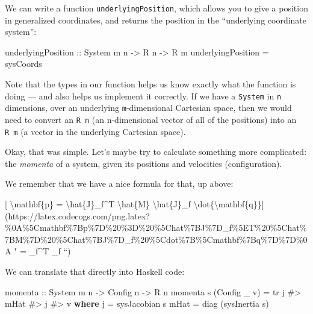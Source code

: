 \documentclass[]{article}
\newenvironment{Shaded}{}{}
\newcommand{\KeywordTok}[1]{\textcolor[rgb]{0.00,0.44,0.13}{\textbf{#1}}}
\newcommand{\DataTypeTok}[1]{\textcolor[rgb]{0.56,0.13,0.00}{#1}}
\newcommand{\OtherTok}[1]{\textcolor[rgb]{0.00,0.44,0.13}{#1}}
\newcommand{\FunctionTok}[1]{\textcolor[rgb]{0.02,0.16,0.49}{#1}}
\newcommand{\NormalTok}[1]{#1}
\begin{document}
We can write a function \texttt{underlyingPosition}, which allows you to give a
position in generalized coordinates, and returns the position in the
``underlying coordinate system'':

\begin{Shaded}
\begin{Highlighting}[]
\OtherTok{underlyingPosition ::} \DataTypeTok{System}\NormalTok{ m n }\OtherTok{->} \DataTypeTok{R}\NormalTok{ n }\OtherTok{->} \DataTypeTok{R}\NormalTok{ m}
\NormalTok{underlyingPosition }\FunctionTok{=}\NormalTok{ sysCoords}
\end{Highlighting}
\end{Shaded}

Note that the types in our function helps us know exactly what the function is
doing --- and also helps us implement it correctly. If we have a \texttt{System}
in \texttt{n} dimensions, over an underlying \texttt{m}-dimensional Cartesian
space, then we would need to convert an \texttt{R\ n} (an n-dimensional vector
of all of the positions) into an \texttt{R\ m} (a vector in the underlying
Cartesian space).

Okay, that was simple. Let's maybe try to calculate something more complicated:
the \emph{momenta} of a system, given its positions and velocities
(configuration).

We remember that we have a nice formula for that, up above:

{[} \textbackslash{}mathbf\{p\} = \textbackslash{}hat\{J\}\_f\^{}T
\textbackslash{}hat\{M\} \textbackslash{}hat\{J\}\_f
\textbackslash{}dot\{\textbackslash{}mathbf\{q\}\}{]}(https://latex.codecogs.com/png.latex?\%0A\%5Cmathbf\%7Bp\%7D\%20\%3D\%20\%5Chat\%7BJ\%7D\_f\%5ET\%20\%5Chat\%7BM\%7D\%20\%5Chat\%7BJ\%7D\_f\%20\%5Cdot\%7B\%5Cmathbf\%7Bq\%7D\%7D\%0A
"  = \_f\^{}T  \_f  ``)

We can translate that directly into Haskell code:

\begin{Shaded}
\begin{Highlighting}[]
\OtherTok{momenta ::} \DataTypeTok{System}\NormalTok{ m n }\OtherTok{->} \DataTypeTok{Config}\NormalTok{ n }\OtherTok{->} \DataTypeTok{R}\NormalTok{ n}
\NormalTok{momenta s (}\DataTypeTok{Config}\NormalTok{ _ v) }\FunctionTok{=}\NormalTok{ tr j }\FunctionTok{#>}\NormalTok{ mHat }\FunctionTok{#>}\NormalTok{ j }\FunctionTok{#>}\NormalTok{ v}
  \KeywordTok{where}
\NormalTok{    j    }\FunctionTok{=}\NormalTok{ sysJacobian s}
\NormalTok{    mHat }\FunctionTok{=}\NormalTok{ diag (sysInertia s)}
\end{Highlighting}
\end{Shaded}
\end{document}
